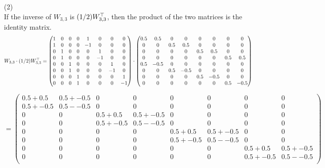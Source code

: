 \documentclass[12pt]{article}
\begin{document}
\medskip
(2) \\
If the inverse of $W_{3, 3}$ is $(1/2) W_{3, 3}^{\top}$, then the product of the two matrices is the identity matrix. 
\[
W_{3, 3} \cdot (1/2) W_{3, 3}^{\top}=
\begin{pmatrix}
1  &  0  &  0 & 0 & 1   &  0   & 0    & 0  \\
1  &  0  &  0 & 0 & -1 &  0   & 0    & 0  \\
0   &  1  &  0 & 0 &  0  & 1   & 0    & 0  \\
0   &  1  &  0 & 0 &  0  & -1 & 0    & 0  \\
0   &  0  &  1 & 0 &  0  &  0  & 1    & 0  \\
0   &  0  &  1 & 0 &  0  &  0  & -1  & 0  \\
0   &  0  &  0 & 1 &  0  &  0  & 0    & 1  \\
0   &  0  &  0 & 1 &  0  &  0  & 0    & -1  \\
\end{pmatrix}
\cdot
\begin{pmatrix}
0.5 & 0.5  & 0   & 0    & 0    & 0     & 0    & 0    \\ 
0   & 0    & 0.5 & 0.5  & 0    & 0     & 0    & 0    \\ 
0   & 0    & 0   & 0    & 0.5  & 0.5   & 0    & 0     \\
0   & 0    & 0   & 0    & 0    & 0     & 0.5  & 0.5   \\
0.5 & -0.5 & 0   & 0    & 0    & 0     & 0    & 0     \\
0   & 0    & 0.5 & -0.5 & 0    & 0     & 0    & 0     \\
0   & 0    & 0   & 0    & 0.5  & -0.5  & 0    & 0     \\
0   & 0    & 0   & 0    & 0    & 0     & 0.5  & -0.5  \\
\end{pmatrix}
\] 

\[
= 
\begin{pmatrix}
0.5 + 0.5  & 0.5 + -0.5 & 0          & 0          & 0          & 0          & 0          & 0          \\
0.5 + -0.5 & 0.5 --0.5  & 0          & 0          & 0          & 0          & 0          & 0          \\
0          & 0          & 0.5 + 0.5  & 0.5 +-0.5  & 0          & 0          &  0          & 0          \\
0          & 0          & 0.5 +-0.5  & 0.5 --0.5  & 0          & 0          & 0          & 0          \\
0          & 0          & 0          & 0          & 0.5 + 0.5  & 0.5 +-0.5  & 0          & 0          \\
0          & 0          & 0          & 0          & 0.5 +-0.5  & 0.5 --0.5  & 0          & 0          \\
0          & 0          & 0          & 0          & 0          & 0          & 0.5 + 0.5  & 0.5 +-0.5  \\
0          & 0          & 0          & 0          & 0          & 0             & 0.5 +-0.5  &  0.5 --0.5\\ 
\end{pmatrix}
\] 
\end{document}
